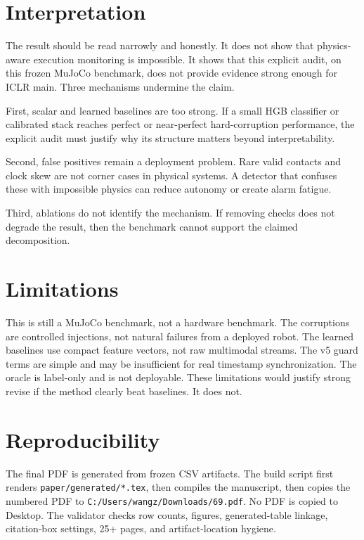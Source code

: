 \documentclass{article}
\begin{document}
\section{Interpretation}

The result should be read narrowly and honestly. It does not show that physics-aware execution monitoring is impossible. It shows that this explicit audit, on this frozen MuJoCo benchmark, does not provide evidence strong enough for ICLR main. Three mechanisms undermine the claim.

First, scalar and learned baselines are too strong. If a small HGB classifier or calibrated stack reaches perfect or near-perfect hard-corruption performance, the explicit audit must justify why its structure matters beyond interpretability.

Second, false positives remain a deployment problem. Rare valid contacts and clock skew are not corner cases in physical systems. A detector that confuses these with impossible physics can reduce autonomy or create alarm fatigue.

Third, ablations do not identify the mechanism. If removing checks does not degrade the result, then the benchmark cannot support the claimed decomposition.

\section{Limitations}

This is still a MuJoCo benchmark, not a hardware benchmark. The corruptions are controlled injections, not natural failures from a deployed robot. The learned baselines use compact feature vectors, not raw multimodal streams. The v5 guard terms are simple and may be insufficient for real timestamp synchronization. The oracle is label-only and is not deployable. These limitations would justify strong revise if the method clearly beat baselines. It does not.

\section{Reproducibility}

The final PDF is generated from frozen CSV artifacts. The build script first renders \texttt{paper/generated/*.tex}, then compiles the manuscript, then copies the numbered PDF to \texttt{C:/Users/wangz/Downloads/69.pdf}. No PDF is copied to Desktop. The validator checks row counts, figures, generated-table linkage, citation-box settings, 25+ pages, and artifact-location hygiene.
\end{document}
